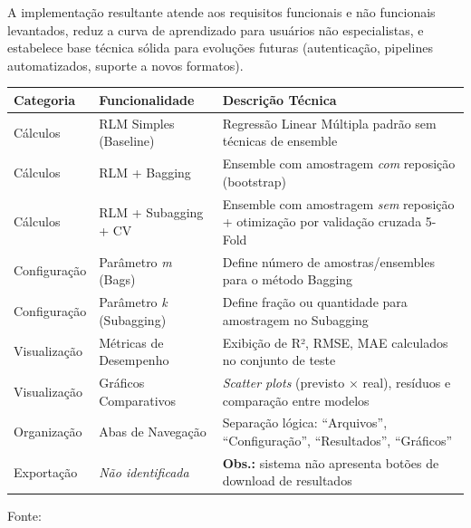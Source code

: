 \documentclass[12pt,a4paper]{article}
\begin{document}
A implementação resultante atende aos requisitos funcionais e não funcionais levantados, reduz a curva de aprendizado para usuários não especialistas, e estabelece base técnica sólida para evoluções futuras (autenticação, pipelines automatizados, suporte a novos formatos).

\begin{quadro}[ht]
\begin{center}
\small
\captionsetup{justification=centering, labelsep=endash, width=0.75\linewidth}
\caption{Inventário das funções do sistema}
\label{tab:funcoes}
\begin{threeparttable}
\begin{tabularx}{\textwidth}{|l|l|X|} \hline
\textbf{Categoria} & \textbf{Funcionalidade} & \textbf{Descrição Técnica} \\ \hline
Cálculos & RLM Simples (Baseline) & Regressão Linear Múltipla padrão sem técnicas de ensemble \\ \hline
Cálculos & RLM + Bagging & Ensemble com amostragem \textit{com} reposição (bootstrap) \\ \hline
Cálculos & RLM + Subagging + CV & Ensemble com amostragem \textit{sem} reposição + otimização por validação cruzada 5-Fold \\ \hline
Configuração & Parâmetro \textit{m} (Bags) & Define número de amostras/ensembles para o método Bagging \\ \hline
Configuração & Parâmetro \textit{k} (Subagging) & Define fração ou quantidade para amostragem no Subagging \\ \hline
Visualização & Métricas de Desempenho & Exibição de R², RMSE, MAE calculados no conjunto de teste \\ \hline
Visualização & Gráficos Comparativos & \textit{Scatter plots} (previsto $\times$ real), resíduos e comparação entre modelos \\ \hline
Organização & Abas de Navegação & Separação lógica: ``Arquivos'', ``Configuração'', ``Resultados'', ``Gráficos'' \\ \hline
Exportação & \textit{Não identificada} & \textbf{Obs.:} sistema não apresenta botões de download de resultados \\ \hline
\end{tabularx}
\begin{tablenotes}[flushleft]
\footnotesize
\item Fonte:~\oautor
\end{tablenotes}
\end{threeparttable}
\end{center}
\end{quadro}
\end{document}
